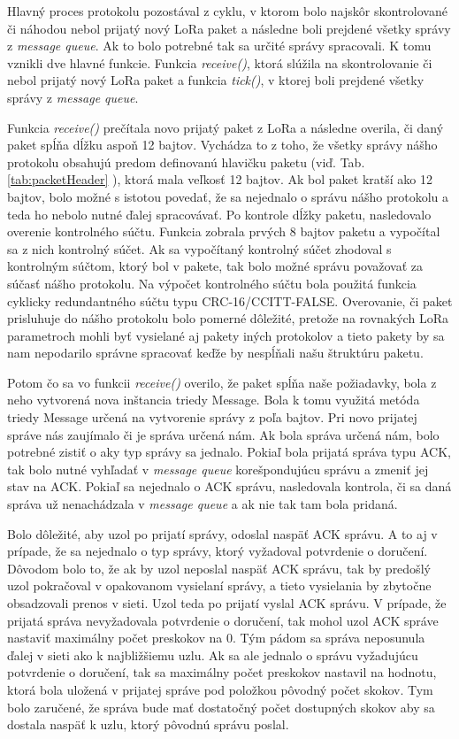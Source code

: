 \documentclass[slovak,master]{diploma}
\begin{document}
Hlavný proces protokolu pozostával z cyklu, v ktorom bolo najskôr skontrolované či náhodou nebol prijatý nový LoRa paket a následne boli prejdené všetky správy z \emph{message queue}. Ak to bolo 
potrebné tak sa určité správy spracovali. K tomu vznikli dve hlavné funkcie. Funkcia \emph{receive()}, ktorá slúžila na skontrolovanie či nebol prijatý nový LoRa paket a funkcia \emph{tick()}, v ktorej boli prejdené všetky správy z \emph{message queue}.

Funkcia \emph{receive()} prečítala novo prijatý paket z LoRa a následne overila, či daný paket spĺňa dĺžku aspoň 12 bajtov. Vychádza to z toho, že všetky správy nášho protokolu obsahujú predom definovanú 
hlavičku paketu (viď. Tab. \ref{tab:packetHeader} ), ktorá mala veľkosť 12 bajtov. Ak bol paket kratší ako 12 bajtov, bolo možné s istotou povedať, že sa nejednalo o správu nášho protokolu a teda ho nebolo 
nutné ďalej spracovávať. Po kontrole dĺžky paketu, nasledovalo overenie kontrolného súčtu. Funkcia zobrala prvých 8 bajtov paketu a vypočítal sa z nich kontrolný súčet. 
Ak sa vypočítaný kontrolný súčet zhodoval s kontrolným súčtom, ktorý bol v pakete, tak bolo možné správu považovať za 
súčasť nášho protokolu. Na výpočet kontrolného súčtu bola použitá funkcia cyklicky redundantného súčtu typu CRC-16/CCITT-FALSE. Overovanie, či paket prisluhuje do nášho protokolu bolo pomerné dôležité, 
pretože na rovnakých LoRa parametroch mohli byť vysielané aj pakety iných protokolov a tieto pakety by sa nam nepodarilo správne spracovať keďže by nespĺňali našu štruktúru paketu.

Potom čo sa vo funkcii \emph{receive()} overilo, že paket spĺňa naše požiadavky, bola z neho vytvorená nova inštancia triedy Message. Bola k tomu využitá metóda triedy Message určená na vytvorenie správy z 
poľa bajtov. Pri novo prijatej správe nás zaujímalo či je správa určená nám. Ak bola správa určená nám, bolo potrebné zistiť o aky typ správy sa jednalo. Pokiaľ bola prijatá správa typu ACK, tak bolo 
nutné vyhľadať v \emph{message queue} korešpondujúcu správu a zmeniť jej stav na ACK. Pokiaľ sa nejednalo o ACK správu, nasledovala kontrola, či sa daná správa už nenachádzala v \emph{message queue} a ak nie tak tam bola pridaná.

Bolo dôležité, aby uzol po prijatí správy, odoslal naspäť ACK správu. A to aj v prípade, že sa nejednalo o typ správy, ktorý vyžadoval potvrdenie o doručení. Dôvodom bolo to, že ak by 
uzol neposlal naspäť ACK správu, tak by predošlý uzol pokračoval v opakovanom vysielaní správy, a tieto vysielania by zbytočne obsadzovali prenos v sieti. Uzol teda po prijatí vyslal ACK správu. 
V prípade, že prijatá správa nevyžadovala potvrdenie o doručení, tak mohol uzol ACK správe nastaviť maximálny počet preskokov na 0. 
Tým pádom sa správa neposunula ďalej v sieti ako k najbližšiemu uzlu. Ak sa ale jednalo o správu vyžadujúcu potvrdenie o doručení, tak sa maximálny počet preskokov nastavil na 
hodnotu, ktorá bola uložená v prijatej správe pod položkou pôvodný počet skokov. 
Tym bolo zaručené, že správa bude mať dostatočný počet dostupných skokov aby sa dostala naspäť k uzlu, ktorý pôvodnú správu poslal.
\end{document}
